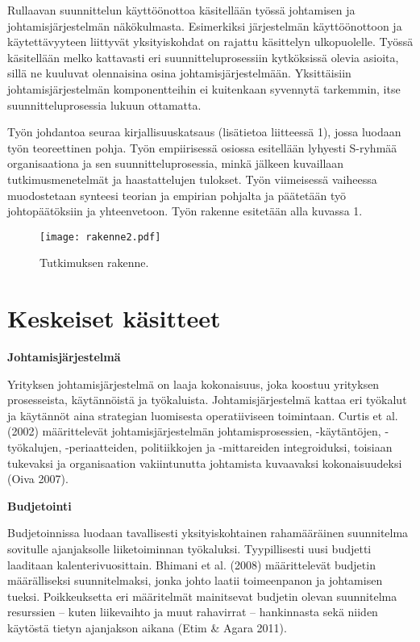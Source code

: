 \documentclass[12pt,a4paper,oneside,pdftex]{report}
\begin{document}
Rullaavan suunnittelun käyttöönottoa käsitellään työssä johtamisen ja johtamisjärjestelmän näkökulmasta. Esimerkiksi järjestelmän käyttöönottoon ja käytettävyyteen liittyvät yksityiskohdat on rajattu käsittelyn ulkopuolelle. Työssä käsitellään melko kattavasti eri suunnitteluprosessiin kytköksissä olevia asioita, sillä ne kuuluvat olennaisina osina johtamisjärjestelmään. Yksittäisiin johtamisjärjestelmän komponentteihin ei kuitenkaan syvennytä tarkemmin, itse suunnitteluprosessia lukuun ottamatta.

Työn johdantoa seuraa kirjallisuuskatsaus (lisätietoa liitteessä 1), jossa luodaan työn teoreettinen pohja. Työn empiirisessä osiossa esitellään lyhyesti S-ryhmää organisaationa ja sen suunnitteluprosessia, minkä jälkeen kuvaillaan tutkimusmenetelmät ja haastattelujen tulokset. Työn viimeisessä vaiheessa muodostetaan synteesi teorian ja empirian pohjalta ja päätetään työ johtopäätöksiin ja yhteenvetoon. Työn rakenne esitetään alla kuvassa 1.

\begin{figure}[ht]
  \begin{center}
    \texttt{[image: rakenne2.pdf]}
    \caption{Tutkimuksen rakenne.}
    \label{fig:rakenne}
  \end{center}
\end{figure}

\section{Keskeiset käsitteet}

\textbf{Johtamisjärjestelmä}

Yrityksen johtamisjärjestelmä on laaja kokonaisuus, joka koostuu yrityksen prosesseista, käytännöistä ja työkaluista. Johtamisjärjestelmä kattaa eri työkalut ja käytännöt aina strategian luomisesta operatiiviseen toimintaan. Curtis et al. (2002) määrittelevät johtamisjärjestelmän johtamisprosessien, -käytäntöjen, -työkalujen, -periaatteiden,  politiikkojen ja -mittareiden integroiduksi, toisiaan tukevaksi ja organisaation vakiintunutta johtamista kuvaavaksi kokonaisuudeksi (Oiva 2007).

\textbf{Budjetointi}

Budjetoinnissa luodaan tavallisesti yksityiskohtainen rahamääräinen suunnitelma sovitulle ajanjaksolle liiketoiminnan työkaluksi. Tyypillisesti uusi budjetti laaditaan kalenterivuosittain. Bhimani et al. (2008) määrittelevät budjetin määrälliseksi suunnitelmaksi, jonka johto laatii toimeenpanon ja johtamisen tueksi. Poikkeuksetta eri määritelmät mainitsevat budjetin olevan suunnitelma resurssien – kuten liikevaihto ja muut rahavirrat – hankinnasta sekä niiden käytöstä tietyn ajanjakson aikana (Etim & Agara 2011).
\end{document}
